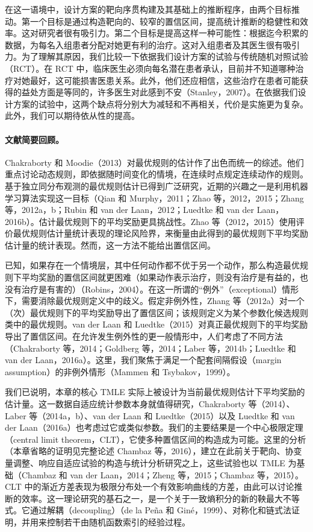 在这一语境中，设计方案的靶向序贯构建及其基础上的推断程序，由两个目标推动。第一个目标是通过构造靶向的、较窄的置信区间，提高统计推断的稳健性和效率。这对研究者很有吸引力。第二个目标是提高这样一种可能性：根据迄今积累的数据，为每名入组患者分配对她更有利的治疗。这对入组患者及其医生很有吸引力。为了理解其原因，我们比较一下依据我们设计方案的试验与传统随机对照试验（RCT）。在 RCT 中，临床医生必须向每名潜在患者承认，目前并不知道哪种治疗对她最好，这可能损害医患关系。此外，他们还应相信，这些治疗在患者可能获得的益处方面是等同的，许多医生对此感到不安（Stanley，2007）。在依据我们设计方案的试验中，这两个缺点将分别大为减轻和不再相关，代价是实施更为复杂。此外，我们可以期待依从性的提高。

\paragraph*{文献简要回顾。}
Chakraborty 和 Moodie（2013）对最优规则的估计作了出色而统一的综述。他们重点讨论动态规则，即依据随时间变化的情境，在连续时点规定连续动作的规则。基于独立同分布观测的最优规则估计已得到广泛研究，近期的兴趣之一是利用机器学习算法实现这一目标（Qian 和 Murphy，2011；Zhao 等，2012，2015；Zhang 等，2012a，b；Rubin 和 van der Laan，2012；Luedtke 和 van der Laan，2016b）。估计最优规则下的平均奖励更具挑战性。Zhao 等（2012，2015）使用评价最优规则估计量统计表现的理论风险界，来衡量由此得到的最优规则下平均奖励估计量的统计表现。然而，这一方法不能给出置信区间。

已知，如果存在一个情境层，其中任何动作都不优于另一个动作，那么构造最优规则下平均奖励的置信区间就更困难（如果动作表示治疗，则没有治疗是有益的，也没有治疗是有害的）（Robins，2004）。在这一所谓的“例外”（exceptional）情形下，需要消除最优规则定义中的歧义。假定非例外性，Zhang 等（2012a）对一个（次）最优规则下的平均奖励导出了置信区间；该规则定义为某个参数化候选规则类中的最优规则。van der Laan 和 Luedtke（2015）对真正最优规则下的平均奖励导出了置信区间。在允许发生例外性的更一般情形中，人们考虑了不同方法（Chakraborty 等，2014；Goldberg 等，2014；Laber 等，2014b；Luedtke 和 van der Laan，2016a）。这里，我们聚焦于满足一个配套间隔假设（margin assumption）的非例外情形（Mammen 和 Tsybakov，1999）。

我们已说明，本章的核心 TMLE 实际上被设计为当前最优规则估计下平均奖励的估计量。这一数据自适应统计参数本身就值得研究，Chakraborty 等（2014）、Laber 等（2014a，b）、van der Laan 和 Luedtke（2015）以及 Luedtke 和 van der Laan（2016a）也考虑过它或类似参数。我们的主要结果是一个中心极限定理（central limit theorem，CLT），它使多种置信区间的构造成为可能。这里的分析（本章省略的证明见完整论述 Chambaz 等，2016），建立在此前关于靶向、协变量调整、响应自适应试验的构造与统计分析研究之上，这些试验也以 TMLE 为基础（Chambaz 和 van der Laan，2014；Zheng 等，2015；Chambaz 等，2015）。CLT 中的渐近方差表现为极限分布处一个有效影响曲线的方差，由此可以讨论推断的效率。这一理论研究的基石之一，是一个关于一致熵积分的新的鞅最大不等式。它通过解耦（decoupling）（de la Peña 和 Giné，1999）、对称化和链式法证明，并用来控制若干由随机函数索引的经验过程。

